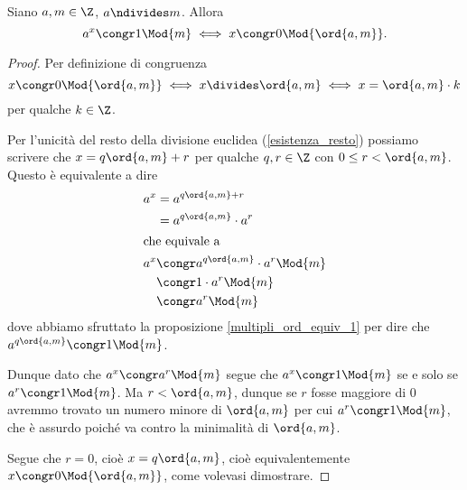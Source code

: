 \begin{proposition}\label{solo_multipli_ord_equiv_1}
    Siano $a, m \in \Z$, $a \ndivides m$. Allora \begin{equation}
        a^x \congr 1 \Mod{m} \iff x \congr 0 \Mod{\ord{a, m}}.
    \end{equation}
\end{proposition}
\begin{proof}
    Per definizione di congruenza 
    \[x \congr 0 \Mod{\ord{a, m}} \iff x \divides \ord{a, m} \iff x = \ord{a, m}\cdot k\] 
    per qualche $k \in \Z$.

    Per l'unicità del resto della divisione euclidea (\ref{esistenza_resto}) possiamo scrivere che $x = q\ord{a, m} + r$ per qualche $q, r \in \Z$ con $0 \leq r < \ord{a, m}$. Questo è equivalente a dire \begin{alignat*}
        {1}
        &\begin{alignedat}
            {1}
            a^x &= a^{q\ord{a, m} + r}\\
            &= a^{q\ord{a, m}}\cdot a^r
        \end{alignedat} \\
        \intertext{che equivale a}
        &\begin{alignedat}
            {1}
            a^x &\congr a^{q\ord{a, m}}\cdot a^r \Mod{m} \\
            &\congr 1 \cdot a^r \Mod{m}\\
            &\congr a^r \Mod{m}
        \end{alignedat}
    \end{alignat*}
    dove abbiamo sfruttato la proposizione \ref{multipli_ord_equiv_1} per dire che $a^{q\ord{a, m}}\congr 1 \Mod{m}$.

    Dunque dato che $a^x \congr a^r \Mod{m}$ segue che $a^x \congr 1 \Mod{m}$ se e solo se $a^r \congr 1 \Mod{m}$. Ma $r < \ord{a, m}$, dunque se $r$ fosse maggiore di $0$ avremmo trovato un numero minore di $\ord{a, m}$ per cui $a^r \congr 1 \Mod{m}$, che è assurdo poiché va contro la minimalità di $\ord{a, m}$.

    Segue che $r = 0$, cioè $x = q\ord{a, m}$, cioè equivalentemente $x \congr 0 \Mod{\ord{a, m}}$, come volevasi dimostrare.
\end{proof}

